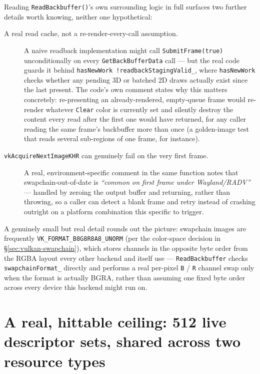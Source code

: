 Reading \texttt{ReadBackbuffer()}'s own surrounding logic in full surfaces two further details
worth knowing, neither one hypothetical:

\begin{description}
  \item[A real read cache, not a re-render-every-call assumption.] A naive readback
        implementation might call \texttt{SubmitFrame(true)} unconditionally on every
        \texttt{GetBackBufferData} call --- but the real code guards it behind
        \texttt{hasNewWork \textbar\textbar{} !readbackStagingValid\_}, where
        \texttt{hasNewWork} checks whether any pending 3D or batched 2D draws actually exist
        since the last present. The code's own comment states why this matters concretely:
        re-presenting an already-rendered, empty-queue frame would re-render whatever
        \texttt{Clear} color is currently set and silently destroy the content every read
        after the first one would have returned, for any caller reading the same frame's
        backbuffer more than once (a golden-image test that reads several sub-regions of one
        frame, for instance).
  \item[\texttt{vkAcquireNextImageKHR} can genuinely fail on the very first frame.] A real,
        environment-specific comment in the same function notes that swapchain-out-of-date is
        \emph{``common on first frame under Wayland/RADV''} --- handled by zeroing the output
        buffer and returning, rather than throwing, so a caller can detect a blank frame and
        retry instead of crashing outright on a platform combination this specific to trigger.
\end{description}

A genuinely small but real detail rounds out the picture: swapchain images are frequently
\texttt{VK\_FORMAT\_B8G8R8A8\_UNORM} (per the color-space decision in
\S\ref{sec:vulkan-swapchain}), which stores channels in the opposite byte order from the RGBA
layout every other backend and  itself use --- \texttt{ReadBackbuffer} checks
\texttt{swapchainFormat\_} directly and performs a real per-pixel \texttt{B} / \texttt{R} channel
swap only when the format is actually BGRA, rather than assuming one fixed byte order across
every device this backend might run on.

\section{A real, hittable ceiling: 512 live descriptor sets, shared across two resource types}
\label{sec:vulkan-descriptor-ceiling}

